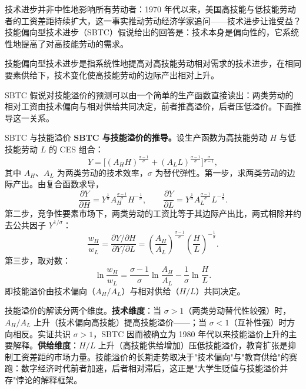 技术进步并非中性地影响所有劳动者：1970 年代以来，美国高技能与低技能劳动者的工资差距持续扩大，这一事实推动劳动经济学家追问——技术进步让谁受益？技能偏向型技术进步（SBTC）假说给出的回答是：技术本身是偏向性的，它系统性地提高了对高技能劳动的需求。

\begin{definition}
技能偏向型技术进步是指系统性地提高对高技能劳动相对需求的技术进步，在相同要素供给下，技术变化使高技能劳动的边际产出相对上升。
\end{definition}

SBTC 假说对技能溢价的预测可以由一个简单的生产函数直接读出：两类劳动的相对工资由技术偏向与相对供给共同决定，前者推高溢价，后者压低溢价。下面推导这一关系。

\begin{derivation}{SBTC 与技能溢价}{}
\textbf{SBTC 与技能溢价的推导。}设生产函数为高技能劳动 $H$ 与低技能劳动 $L$ 的 CES 组合：
\[
Y = \bigl[(A_H H)^{\frac{\sigma-1}{\sigma}} + (A_L L)^{\frac{\sigma-1}{\sigma}}\bigr]^{\frac{\sigma}{\sigma-1}},
\]
其中 $A_H$、$A_L$ 为两类劳动的技术效率，$\sigma$ 为替代弹性。第一步，求两类劳动的边际产出。由复合函数求导，
\[
\frac{\partial Y}{\partial H} = Y^{\frac{1}{\sigma}} A_H^{\frac{\sigma-1}{\sigma}} H^{-\frac{1}{\sigma}}, \qquad
\frac{\partial Y}{\partial L} = Y^{\frac{1}{\sigma}} A_L^{\frac{\sigma-1}{\sigma}} L^{-\frac{1}{\sigma}}.
\]
第二步，竞争性要素市场下，两类劳动的工资比等于其边际产出比，两式相除并约去公共因子 $Y^{1/\sigma}$：
\[
\frac{w_H}{w_L} = \frac{\partial Y/\partial H}{\partial Y/\partial L} = \left(\frac{A_H}{A_L}\right)^{\frac{\sigma-1}{\sigma}} \left(\frac{H}{L}\right)^{-\frac{1}{\sigma}}.
\]
第三步，取对数：
\[
\ln\frac{w_H}{w_L} = \frac{\sigma-1}{\sigma}\ln\frac{A_H}{A_L} - \frac{1}{\sigma}\ln\frac{H}{L}.
\]
即技能溢价由技术偏向（$A_H/A_L$）与相对供给（$H/L$）共同决定。
\end{derivation}

技能溢价的解读分两个维度。\textbf{技术维度}：当 $\sigma > 1$（两类劳动替代性较强）时，$A_H/A_L$ 上升（技术偏向高技能）提高技能溢价——；当 $\sigma < 1$（互补性强）时方向相反。实证共识 $\sigma > 1$，SBTC 因而被确立为 1980 年代以来技能溢价上升的主要解释。\textbf{供给维度}：$H/L$ 上升（高技能供给增加）压低技能溢价，教育扩张是抑制工资差距的市场力量。技能溢价的长期走势取决于"技术偏向"与"教育供给"的赛跑：数字经济时代前者加速，后者相对滞后，这正是"大学生贬值与技能溢价并存"悖论的解释框架。

